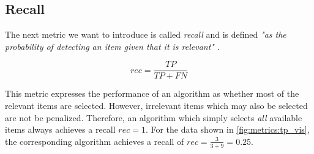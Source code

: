 \subsection{Recall}
\label{chp:fundamentals:sec:metrics:subsec:Recall}

The next metric we want to introduce is called \textit{recall} and is defined \textit{"as the probability of detecting an item given that it is relevant"} \parencite{Zhu:2004}.

\begin{equation}\label{eq:recall}
    rec = \frac{TP}{TP+FN}
\end{equation}

This metric expresses the performance of an algorithm as whether most of the relevant items are selected.
However, irrelevant items which may also be selected are not be penalized.
Therefore, an algorithm which simply selects \textit{all} available items always achieves a recall $rec=1$.
For the data shown in \cref{fig:metrics:tp_vis}, the corresponding algorithm achieves a recall of $rec = \frac{3}{3+9} = 0.25$.

